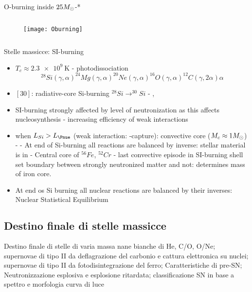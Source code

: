 \begin{frame}{O-burning inside $25M_{\odot}{}$-*}
    \begin{columns}[T]
        \begin{column}{0.4\textwidth}
    \begin{figure}[!ht]
			\texttt{[image: Oburning]}\label{fig:Oburning}
		\end{figure}
        \end{column}
        \begin{column}{0.6\textwidth}
            
        \end{column}
    \end{columns}
    
\end{frame}
\begin{frame}{Stelle massicce: SI-burning}
\begin{itemize}
	\item $T_c\approx\SI{2.3e9}{\kelvin}$ - photodissociation
	\[^{28}Si(\gamma,\alpha)^{24}Mg(\gamma,\alpha)^{20}Ne(\gamma,\alpha)^{16}O(\gamma,\alpha)^{12}C(\gamma,2\alpha)\alpha\]
	\item $[30]$: radiative-core Si-burning $^{28}Si\to^{30}Si$ - , 
	\item SI-burning strongly affected by level of neutronization as this affects nucleosynthesis - increasing efficiency of weak interactions
    \item when $L_{Si}>L_{\Pnue} $ (weak interaction: \Pelectron-capture): convective core ($M_c\approx1M_{\odot}$) -  - At end of Si-burning all reactions are balanced by inverse: stellar material is in  - Central core of $^{56}Fe$, $^{52}Cr$ - last convective episode in SI-burning shell set boundary between strongly neutronized matter and not: determines mass of iron core.
    \item At end os Si burning all nuclear reactions are balanced by their inverses: Nuclear Statistical Equilibrium
\end{itemize}
\end{frame}

\subsection{Destino finale di stelle massicce}

\begin{frame}{Destino finale di stelle di varia massa}
nane bianche di He, C/O, O/Ne; supernovae di tipo II da deflagrazione del carbonio e cattura elettronica su nuclei; supernovae di tipo II da fotodisintegrazione del ferro; Caratteristiche di pre-SN; Neutronizzazione esplosiva e esplosione ritardata; classificazione SN in base a spettro e morfologia curva di luce
\end{frame}



